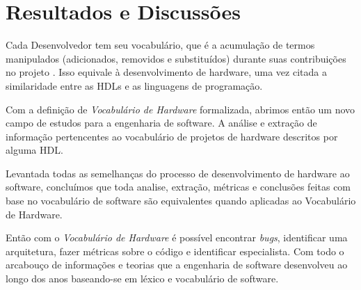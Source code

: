 \documentclass[12pt, twocolumn, a4paper]{article}
\begin{document}
	\section{Resultados e Discussões}
  
\quad Cada Desenvolvedor tem seu vocabulário, que é a acumulação de termos manipulados (adicionados, removidos e substituídos) durante suas contribuições no projeto \cite{Santos2015}. Isso equivale à desenvolvimento de hardware, uma vez citada a similaridade entre as HDLs e as linguagens de programação.

Com a definição de \textit{Vocabulário de Hardware} formalizada, abrimos então um novo campo de estudos para a engenharia de software. A análise e extração de informação pertencentes ao vocabulário de projetos de hardware descritos por alguma HDL.

Levantada todas as semelhanças do processo de desenvolvimento de hardware ao software, concluímos que toda analise, extração, métricas e conclusões feitas com base no vocabulário de software são equivalentes quando aplicadas ao Vocabulário de Hardware.

Então com o \textit{Vocabulário de Hardware} é possível encontrar  \textit{bugs}, identificar uma arquitetura, fazer métricas sobre o código e identificar especialista. Com todo o arcabouço de informações e teorias que a engenharia de software desenvolveu ao longo dos anos baseando-se em léxico e vocabulário de software.

	
	
	
\end{document}
